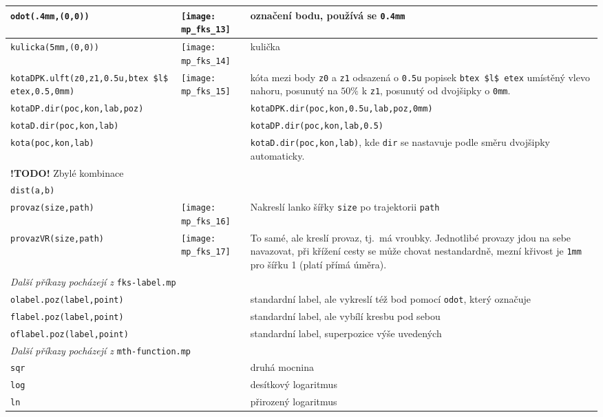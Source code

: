 \documentclass[a4paper,10pt]{article}
\begin{document}
\begin{tabularx}{\textwidth}{|l|l|X|}
    \verb+odot(.4mm,(0,0))+ & \texttt{[image: mp\_fks\_13]}&
	označení bodu, používá se {\tt 0.4mm}\\\hline
    \verb+kulicka(5mm,(0,0))+ & \texttt{[image: mp\_fks\_14]}&
	kulička\\\hline
    \verb+kotaDPK.ulft(z0,z1,0.5u,btex $l$ etex,0.5,0mm)+ &
	\raise-24pt\hbox{\texttt{[image: mp\_fks\_15]}} & 
	kóta mezi body \verb+z0+ a \verb+z1+ odsazená o \verb+0.5u+ popisek 
	\verb+btex $l$ etex+ umístěný vlevo nahoru, posunutý na $50\%$ 
	k \verb+z1+, posunutý od dvojšipky o \verb+0mm+.\\\hline
    \verb+kotaDP.dir(poc,kon,lab,poz)+ &&
	\verb+kotaDPK.dir(poc,kon,0.5u,lab,poz,0mm)+\\\hline
    \verb+kotaD.dir(poc,kon,lab)+ &&
	\verb+kotaDP.dir(poc,kon,lab,0.5)+\\\hline
    \verb+kota(poc,kon,lab)+ &&
	\verb+kotaD.dir(poc,kon,lab)+, kde \verb+dir+ se nastavuje podle
	směru dvojšipky automaticky.\\\hline
    {\bf !TODO!} Zbylé kombinace&&\\\hline
    \verb+dist(a,b)+&&\\\hline
    \verb+provaz(size,path)+&\texttt{[image: mp\_fks\_16]}&Nakreslí lanko šířky
	\verb+size+ po trajektorii \verb+path+\\\hline
    \verb+provazVR(size,path)+&\texttt{[image: mp\_fks\_17]}&To samé, ale kreslí
	provaz, tj.~má vroubky. Jednotlibé provazy jdou na sebe navazovat, 
	při křížení cesty se může chovat nestandardně, mezní křivost je 
	\verb+1mm+ pro šířku 1 (platí přímá úměra).\\\hline
    \multicolumn{3}{|l|}{\emph{Další příkazy pocházejí z} {\tt fks-label.mp}}\\\hline
    \verb+olabel.poz(label,point)+ & & 
	standardní label, ale vykreslí též bod pomocí \verb+odot+, 
	který označuje\\\hline
    \verb+flabel.poz(label,point)+ & & 
	standardní label, ale vybílí kresbu pod sebou\\\hline
    \verb+oflabel.poz(label,point)+ & & 
	standardní label, superpozice výše uvedených\\\hline
    \multicolumn{3}{|l|}{\emph{Další příkazy pocházejí z} 
	{\tt mth-function.mp}}\\\hline
    \verb+sqr+  && druhá mocnina\\\hline
    \verb+log+  && desítkový logaritmus\\\hline
    \verb+ln+   && přirozený logaritmus\\\hline

\end{tabularx}
\end{document}
